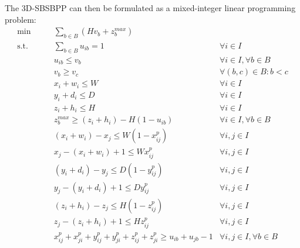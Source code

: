 The 3D-SBSBPP can then be formulated as a mixed-integer linear programming problem:
\label{par:standard_const}
\begin{align}
   \min       \qquad& \sum\limits_{b \in B} (H v_b + z^{max}_b) & \label{eq:objective} \\
   \text{s.t.} \qquad& \sum\limits_{b \in B}{u_{ib}} = 1 & \forall i \in I  \label{cons:all_items_in_bin} \\
                    & u_{ib} \le v_b & \forall i \in I, \forall b \in B \label{cons:items_in_used_bins} \\
                    & v_b \ge v_c & \forall (b,c) \in B : b < c  \label{cons:bin_breaking} \\
                    & x_i + w_i \le W & \forall i \in I \label{cons:inside_x} \\ 
                    & y_i + d_i \le D & \forall i \in I \label{cons:inside_y} \\ 
                    & z_i + h_i \le H & \forall i \in I \label{cons:inside_z} \\ 
                    & z^{max}_b \ge (z_i + h_i) - H(1-u_{ib}) & \forall i \in I, \forall b \in B \label{cons:maxz} \\
                    & (x_i + w_i) - x_j\le W(1 - x^p_{ij}) & \forall i,j \in I \label{cons:x_prec_1} \\
                    & x_j - (x_i + w_i) + 1 \le W x^p_{ij} & \forall i,j \in I \label{cons:x_prec_2} \\
                    & (y_i + d_i) - y_j \le D(1 - y^p_{ij}) & \forall i,j \in I \label{cons:y_prec_1} \\
                    & y_j - (y_i + d_i) + 1 \le D y^p_{ij} & \forall i,j \in I \label{cons:y_prec_2} \\
                    & (z_i + h_i) - z_j\le H(1 - z^p_{ij}) & \forall i,j \in I \label{cons:z_prec_1} \\
                    & z_j - (z_i + h_i) + 1 \le H z^p_{ij} & \forall i,j \in I \label{cons:z_prec_2} \\
                    & x^p_{ij} + x^p_{ji} + y^p_{ij} + y^p_{ji} + z^p_{ij} + z^p_{ji} \ge u_{ib} + u_{jb} - 1 & \forall i,j \in I, \forall b \in B \label{cons:no_overlap}
\end{align}

